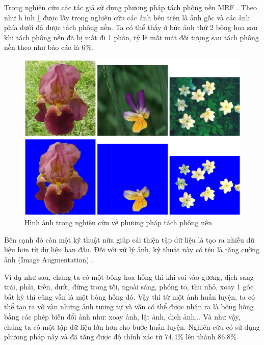 \documentclass[12pt]{report}
\begin{document}
		Trong nghiên cứu \cite{cia-Nilsback06} \cite{cia-Nilsback08} các tác giả sử dụng phương pháp tách phông nền MRF \cite{cia_MRF}. Theo như h ình \ref{fig:anh_tach_phong_nen} được lấy trong nghiên cứu \cite{cia-Nilsback06} các ảnh bên trên là ảnh gốc và các ảnh phía dưới đã được tách phông nền. Ta có thể thấy ở bức ảnh thứ 2 bông hoa sau khi tách phông nền đã bị mất đi 1 phần, tỷ lệ mất mát đối tượng sau tách phông nền theo như báo cáo là 6\%.
																																																		
		\begin{figure}[h]
			\centering
			\includegraphics[scale=0.6]{anh_tach_phong_nen}
			\caption{Hình ảnh trong nghiên cứu \cite{cia-Nilsback06} về phương pháp tách phông nền}
			\label{fig:anh_tach_phong_nen}
		\end{figure}
																																																		
		Bên cạnh đó còn một kỹ thuật nữa giúp cải thiện tập dữ liệu là tạo ra nhiều dữ liệu hơn từ dữ liệu ban đầu. Đối với xử lý ảnh, kỹ thuật này có tên là tăng cường ảnh (Image Augmentation) \cite{cia_image_augmentation_1} \cite{cia_image_augmentation_2} . 
		
		Ví dụ như sau, chúng ta có một bông hoa hồng thì khi soi vào gương, dịch sang trái, phải, trên, dưới, đứng trong tối, ngoài sáng, phóng to, thu nhỏ, xoay 1 góc bất kỳ thì cũng vẫn là một bông hồng đó. Vậy thì từ một ảnh huấn luyện, ta có thể tạo ra vô vàn những ảnh tương tự và vẫn có thể được nhận ra là bông hồng bằng các phép biến đổi ảnh như: xoay ảnh, lật ảnh, dịch ảnh,.. Và như vậy, chúng ta có một tập dữ liệu lớn hơn cho bước huấn luyện. Nghiên cứu \cite{cia-CNNFeatures off-the-shelf} có sử dụng phương pháp này và đã tăng được độ chính xác từ 74,4\% lên thành 86.8\%
																																																		
\end{document}
